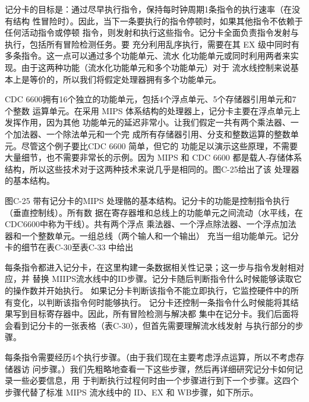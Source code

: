 记分卡的目标是：通过尽早执行指令，保持每时钟周期1条指令的执行速率（在没有结构
性冒险时）。因此，当下一条要执行的指令停顿时，如果其他指令不依赖于任何活动指令或停顿
指令，则发射和执行这些指令。记分卡全面负责指令发射与执行，包括所有冒险检测任务。要
充分利用乱序执行，需要在其 EX 级中同时有多条指令。这一点可以通过多个功能单元、流水
化功能单元或同时利用两者来实现。由于这两种功能（流水化功能单元和多个功能单元）对于
流水线控制来说基本上是等价的，所以我们将假定处理器拥有多个功能单元。

CDC 6600拥有16个独立的功能单元，包括4个浮点单元、5个存储器引用单元和7个整数
运算单元。在采用 MIPS 体系结构的处理器上，记分卡主要在浮点单元上发挥作用，因为其他
功能单元的延迟非常小。让我们假定一共有两个乘法器、一个加法器、一个除法单元和一个完
成所有存储器引用、分支和整数运算的整数单元。尽管这个例子要比CDC 6600 简单，但它的
功能足以演示这些原理，不需要大量细节，也不需要非常长的示例。因为 MIPS 和 CDC 6600
都是载人-存储体系结构，所以这些技术对于这两种技术来说几乎是相同的。图C-25给出了该
处理器的基本结构。

图C-25 带有记分卡的MIPS 处理骼的基本结构。记分卡的功能是控制指令执行（垂直控制线）。所有数
据在寄存器堆和总线上的功能单元之间流动（水平线，在CDC6600中称为干线）。共有两个浮点
乘法器、一个浮点除法器、一个浮点加法器和一个整数单元。一组总线（两个输人和一个输出）
充当一组功能单元。记分卡的细节在表C-30至表C-33 中给出

每条指令都进入记分卡，在这里构建一条数据相关性记录；这一步与指令发射相对应，并
替换 MIIPS流水线中的ID步骤。记分卡随后判断指令什么时候能够读取它的操作数并开始执行。
如果记分卡判断该指令不能立即执行，它监控硬件中的所有变化，以判断该指令何时能够执行。
记分卡还控制一条指令什么时候能将其结果写到目标寄存器中。因此，所有冒险检测与解决都
集中在记分卡。我们后面将会看到记分卡的一张表格（表C-30），但首先需要理解流水线发射
与执行部分的步骤。

每条指令需要经历4个执行步骤。（由于我们现在主要考虑浮点运算，所以不考虑存储器访
问步骤。）我们先粗略地查看一下这些步骤，然后再详细研究记分卡如何记录一些必要信息，用
于判断执行过程何时由一个步骤进行到下一个步骤。这四个步骤代替了标准 MIPS 流水线中的
ID、EX 和 WB步骤，如下所示。

